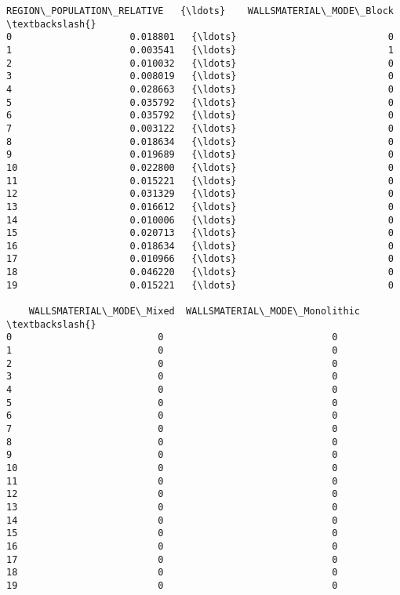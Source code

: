 \documentclass[11pt]{article}
\begin{document}
\begin{Verbatim}[commandchars=\\\{\}]
    REGION\_POPULATION\_RELATIVE   {\ldots}    WALLSMATERIAL\_MODE\_Block  \textbackslash{}
0                     0.018801   {\ldots}                           0   
1                     0.003541   {\ldots}                           1   
2                     0.010032   {\ldots}                           0   
3                     0.008019   {\ldots}                           0   
4                     0.028663   {\ldots}                           0   
5                     0.035792   {\ldots}                           0   
6                     0.035792   {\ldots}                           0   
7                     0.003122   {\ldots}                           0   
8                     0.018634   {\ldots}                           0   
9                     0.019689   {\ldots}                           0   
10                    0.022800   {\ldots}                           0   
11                    0.015221   {\ldots}                           0   
12                    0.031329   {\ldots}                           0   
13                    0.016612   {\ldots}                           0   
14                    0.010006   {\ldots}                           0   
15                    0.020713   {\ldots}                           0   
16                    0.018634   {\ldots}                           0   
17                    0.010966   {\ldots}                           0   
18                    0.046220   {\ldots}                           0   
19                    0.015221   {\ldots}                           0   

    WALLSMATERIAL\_MODE\_Mixed  WALLSMATERIAL\_MODE\_Monolithic  \textbackslash{}
0                          0                              0   
1                          0                              0   
2                          0                              0   
3                          0                              0   
4                          0                              0   
5                          0                              0   
6                          0                              0   
7                          0                              0   
8                          0                              0   
9                          0                              0   
10                         0                              0   
11                         0                              0   
12                         0                              0   
13                         0                              0   
14                         0                              0   
15                         0                              0   
16                         0                              0   
17                         0                              0   
18                         0                              0   
19                         0                              0   


\end{Verbatim}
\end{document}
